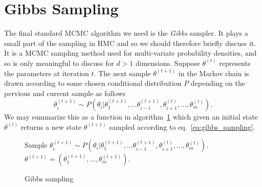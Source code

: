 \section{Gibbs Sampling}
The final standard MCMC algorithm we need is the \textit{Gibbs} sampler. It plays a small
part of the sampling in HMC and so we should therefore briefly discuss it.
It is a MCMC sampling method used for multi-variate probability densities, and
so is only meaningful to discuss for $d > 1$ dimensions.
Suppose $\theta^{(t)}$ represents the parameters at iteration $t$. 
The next sample $\theta^{(t+1)}$ in the Markov chain is drawn according to some chosen
conditional distribution $P$ depending on the pervious and current sample as follows
\begin{equation}\label{eq:gibbs_sampling}
  \theta_i^{(t+1)} \sim P(\theta_i|\theta_{1}^{(t+1)}, \ldots \theta_{i-1}^{(t+1)}, \theta_{i+1}^{(t)}, \ldots, \theta_{m}^{(t)}).
\end{equation}
We may summarize this as a function in algorithm~\ref{algo:gibbs} which 
given an initial state $\theta^{(t)}$ returns a new state $\theta^{(t+1)}$
sampled according to eq.~\eqref{eq:gibbs_sampling}.
\begin{figure}[H]
  \begin{algorithm}[H]
    \caption{Gibbs sampling}\label{algo:gibbs}
    \begin{algorithmic}
          \State Sample $\theta_i^{(t+1)} \sim P(\theta_i|\theta_{1}^{(t+1)}, \ldots \theta_{i-1}^{(t+1)}, \theta_{i+1}^{(t)}, \ldots, \theta_{m}^{(t)}).$
        \EndFor \\
        \Return $\theta^{(t+1)} = \left(\theta_1^{(t+1)}, \ldots, \theta_m^{(t+1)}\right)$.
      \EndFunction
    \end{algorithmic}
  \end{algorithm}
\end{figure}



